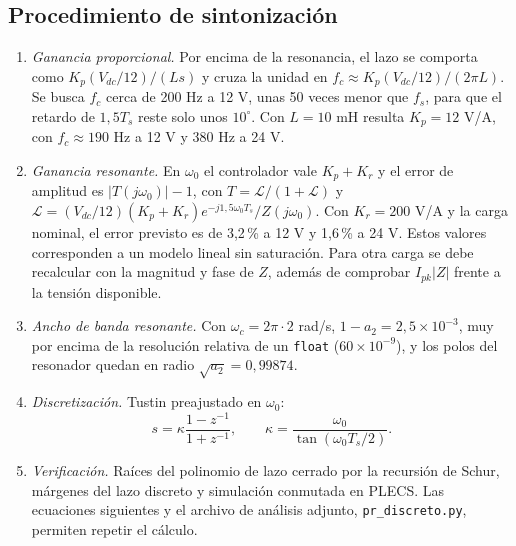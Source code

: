 \documentclass[conference]{IEEEtran}
\begin{document}
\subsection{Procedimiento de sintonización}
\begin{enumerate}
\item \emph{Ganancia proporcional.} Por encima de la resonancia, el lazo se comporta como $K_p(V_{dc}/12)/(Ls)$ y cruza la unidad en $f_c\approx K_p(V_{dc}/12)/(2\pi L)$. Se busca $f_c$ cerca de 200 Hz a 12 V, unas 50 veces menor que $f_s$, para que el retardo de $1{,}5T_s$ reste solo unos $10^\circ$. Con $L=10$ mH resulta $K_p=12$ V/A, con $f_c\approx190$ Hz a 12 V y 380 Hz a 24 V.
\item \emph{Ganancia resonante.} En $\omega_0$ el controlador vale $K_p+K_r$ y el error de amplitud es $|T(j\omega_0)|-1$, con $T=\mathcal{L}/(1+\mathcal{L})$ y $\mathcal{L}=(V_{dc}/12)(K_p+K_r)e^{-j1{,}5\omega_0T_s}/Z(j\omega_0)$. Con $K_r=200$ V/A y la carga nominal, el error previsto es de 3,2\,\% a 12 V y 1,6\,\% a 24 V. Estos valores corresponden a un modelo lineal sin saturación. Para otra carga se debe recalcular con la magnitud y fase de $Z$, además de comprobar $I_{pk}|Z|$ frente a la tensión disponible.
\item \emph{Ancho de banda resonante.} Con $\omega_c=2\pi\cdot2$ rad/s, $1-a_2=2{,}5\times10^{-3}$, muy por encima de la resolución relativa de un \texttt{float} ($60\times10^{-9}$), y los polos del resonador quedan en radio $\sqrt{a_2}=0{,}99874$.
\item \emph{Discretización.} Tustin preajustado en $\omega_0$:
\begin{equation}
s=\kappa\frac{1-z^{-1}}{1+z^{-1}},\qquad \kappa=\frac{\omega_0}{\tan(\omega_0T_s/2)}.
\end{equation}
\item \emph{Verificación.} Raíces del polinomio de lazo cerrado por la recursión de Schur, márgenes del lazo discreto y simulación conmutada en PLECS. Las ecuaciones siguientes y el archivo de análisis adjunto, \texttt{pr\_discreto.py}, permiten repetir el cálculo.
\end{enumerate}
\end{document}
